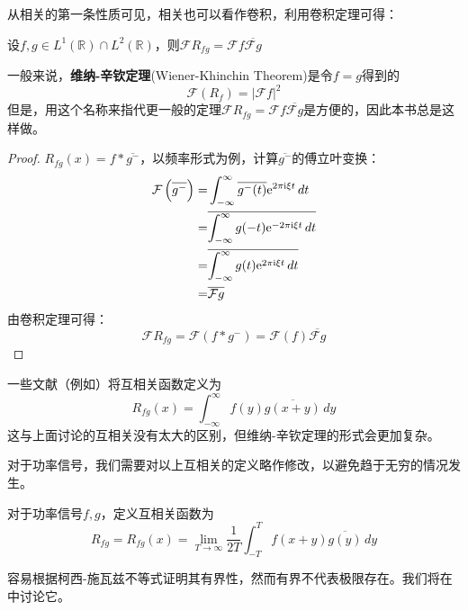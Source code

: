 从相关的第一条性质可见，相关也可以看作卷积，利用卷积定理可得：

\begin{theorem}[维纳-辛钦定理]\label{thm:winner-khinchin}
    设$f,g\in L^1(\mathbb{R})\cap L^2(\mathbb{R})$，则$\mathcal{F} R_{fg} =\mathcal{F} f\overline{\mathcal{F} g}$
\end{theorem}
\begin{remark}
    一般来说，\textbf{维纳-辛钦定理}(Wiener-Khinchin Theorem)是令$f=g$得到的
    $$\mathcal{F}(R_f)=|\mathcal{F} f|^2$$
    但是，用这个名称来指代更一般的定理$\mathcal{F}R_{fg}=\mathcal{F}f\overline{\mathcal{F}g}$是方便的，因此本书总是这样做。
\end{remark}
\begin{proof}
    $R_{fg}(x)=f*\overline{g^-}$，以频率形式为例，计算$\overline{g^-}$的傅立叶变换：
    \begin{align*}
        \mathcal{F}\left(\overline{g^-}\right)= & \int_{-\infty}^\infty \overline{g^-(t)}\mathrm{e}^{2\pi\mathrm{i}\xi t}\,dt \\
        =                                       & \overline{\int_{-\infty}^\infty g(-t)\mathrm{e}^{-2\pi\mathrm{i}\xi t}\,dt} \\
        =                                       & \overline{\int_{-\infty}^\infty g(t)\mathrm{e}^{2\pi\mathrm{i}\xi t}\,dt}   \\
        =                                       & \overline{\mathcal{F}g}
    \end{align*}
    由卷积定理可得：
    $$\mathcal{F}R_{fg}=\mathcal{F}(f*g^-)=\mathcal{F}(f)\overline{\mathcal{F}g}$$
\end{proof}

一些文献（例如\cite{brad_osgood_ee261}）将互相关函数定义为
$$R_{fg}(x)=\int_{-\infty}^{\infty}f(y)\overline{g(x+y)}\,dy$$
这与上面讨论的互相关没有太大的区别，但维纳-辛钦定理的形式会更加复杂。

对于功率信号，我们需要对以上互相关的定义略作修改，以避免趋于无穷的情况发生。
\begin{definition}[功率信号的互相关]
    对于功率信号$f,g$，定义互相关函数为
    \begin{equation*}
        R_{fg}=R_{fg}(x)=\lim_{T\to\infty}\frac{1}{2T}\int_{-T}^{T}f(x+y)\overline{g(y)}\,dy
    \end{equation*}
\end{definition}
容易根据柯西-施瓦兹不等式证明其有界性，然而有界不代表极限存在。我们将在中讨论它。


